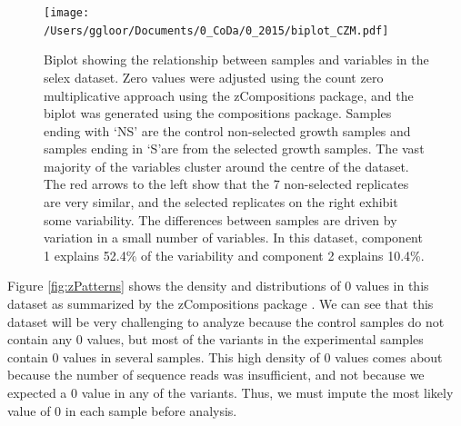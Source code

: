 \documentclass[article]{ajs}\usepackage[]{graphicx}\usepackage[]{color}
\begin{document}
\begin{figure}[!ht]
\centerline{\texttt{[image: /Users/ggloor/Documents/0\_CoDa/0\_2015/biplot\_CZM.pdf]}}
\vspace{3mm} \caption{Biplot showing the relationship between samples and variables in the selex dataset. Zero values were adjusted using the count zero multiplicative approach using the zCompositions  package, and the biplot was generated using the compositions  package. Samples ending with `NS' are the control non-selected growth samples and samples ending in `S'are from the selected growth samples.  The vast majority  of the variables cluster around the centre of the dataset. The red arrows to the left show that the 7 non-selected replicates are very similar, and the selected replicates on the right exhibit some variability. The differences between samples are driven by variation in a small number of variables.  In this dataset, component 1 explains 52.4\% of the variability and component 2 explains 10.4\%.}
\label{fig:biplot}
\end{figure}

Figure \ref{fig:zPatterns} shows the density and distributions of 0 values in this dataset as summarized by the zCompositions  package \citep{PalareaAlbaladejo201585}.  We can see that this dataset will be very challenging to analyze because the control samples do not contain any 0 values, but most of the variants in the experimental samples contain 0 values in several samples. This high density of 0 values comes about because the number of sequence reads was insufficient, and not because we expected a 0 value in any of the variants. Thus, we must impute the most likely value of 0 in each sample before analysis. 
\end{document}
